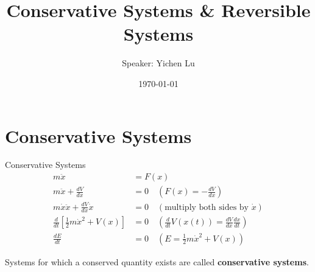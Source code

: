 \documentclass[9pt,aspectratio=43,mathserif,table]{beamer}
\title{Conservative Systems \& Reversible Systems}
\author{Speaker: Yichen Lu\quad \newline  \newline \quad }
\institute{\fontsize{8pt}{14pt}}
\date{\today}
\begin{document}

\frame{\titlepage}


\section{Conservative Systems}

\begin{frame}{Conservative Systems}
    \begin{align*}
		m\ddot{x}&=F(x)\\
		m\ddot{x}+\frac{dV}{dx}&=0 \quad \left(F(x)=-\frac{dV}{dx}\right)\\
		m\dot{x}\ddot{x}+\frac{dV}{dx}\dot{x}&=0 \quad \left(\text{multiply both sides by } \dot{x}\right)\\
		\frac{d}{dt}\left[\frac{1}{2}m\dot{x}^2+V(x)\right]&=0 \quad \left(\frac{d}{dt}V(x(t))=\frac{dV}{dx}\frac{dx}{dt}\right)\\
		\frac{dE}{dt}&=0 \quad \left(E=\frac{1}{2}m\dot{x}^2+V(x)\right)
	\end{align*}

	Systems for which a conserved quantity exists are called \textbf{conservative systems}.

\end{frame}
\end{document}
